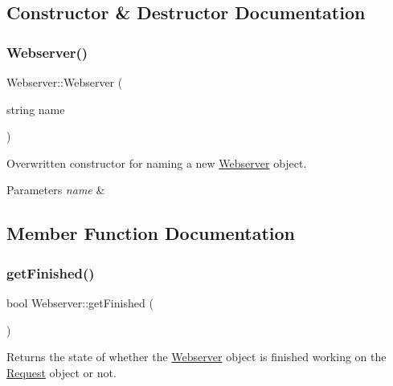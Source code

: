\subsection{Constructor \& Destructor Documentation}
\mbox{\label{classWebserver_ac66530e2c75f4489f3fd0a37d1265a21}} 
\subsubsection{\texorpdfstring{Webserver()}{Webserver()}}
{\footnotesize\ttfamily Webserver\+::\+Webserver (\begin{DoxyParamCaption}\item[{string}]{name }\end{DoxyParamCaption})\hspace{0.3cm}{\ttfamily [inline]}}



Overwritten constructor for naming a new \hyperlink{classWebserver}{Webserver} object. 


\begin{DoxyParams}{Parameters}
{\em name} & \\
\hline
\end{DoxyParams}


\subsection{Member Function Documentation}
\mbox{\label{classWebserver_a2244e2e2e5f992498a17b5caa90af73b}} 
\subsubsection{\texorpdfstring{get\+Finished()}{getFinished()}}
{\footnotesize\ttfamily bool Webserver\+::get\+Finished (\begin{DoxyParamCaption}{ }\end{DoxyParamCaption})\hspace{0.3cm}{\ttfamily [inline]}}



Returns the state of whether the \hyperlink{classWebserver}{Webserver} object is finished working on the \hyperlink{classRequest}{Request} object or not. 

